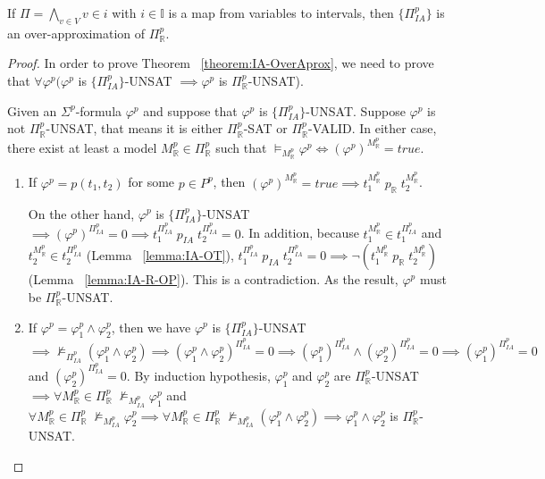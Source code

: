 \begin{theorem} \label{theorem:IA-OverAprox}
If $\Pi = \bigwedge\limits_{v \in V}v \in i$ with $i \in \mathbb{I}$ is a map from variables to intervals, then $\{\Pi^p_{IA}\}$ is an over-approximation of $\Pi^p_\mathbb{R}$.
\end{theorem}

\begin{proof}
In order to prove Theorem ~\ref{theorem:IA-OverAprox}, we need to prove that $\forall \varphi^p (\varphi^p$ is $\{\Pi^p_{IA}\}$-UNSAT $\implies \varphi^p$ is $\Pi^p_\mathbb{R}$-UNSAT). 

Given an $\Sigma^p$-formula $\varphi^p$ and suppose that $\varphi^p$ is $\{\Pi^p_{IA}\}$-UNSAT.
Suppose $\varphi^p$ is not $\Pi^p_\mathbb{R}$-UNSAT, that means it is either  $\Pi^p_\mathbb{R}$-SAT or  $\Pi^p_\mathbb{R}$-VALID. In either case, there exist at least a model $M^p_\mathbb{R} \in \Pi^p_\mathbb{R}$ such that $\models_{M^p_\mathbb{R}} \varphi^p \iff (\varphi^p)^{M^p_\mathbb{R}}= true$.
\begin{enumerate}
\item \sloppy If $\varphi^p = p(t_1, t_2)$ for some $p \in P^p$, then $(\varphi^p)^{M^p_\mathbb{R}}= true \implies t_1^{M^p_\mathbb{R}} \; p_\mathbb{R} \; t_2^{M^p_\mathbb{R}}$. 

On the other hand, $\varphi^p$ is $\{\Pi^p_{IA}\}$-UNSAT $\implies (\varphi^p)^{\Pi^p_{IA}} = 0  \implies t_1^{\Pi^p_{IA}} \; p_{IA} \; t_2^{\Pi^p_{IA}} = 0 $. In addition, because $t_1^{M^p_\mathbb{R}} \in t_1^{\Pi^p_{IA}}$ and $t_2^{M^p_\mathbb{R}} \in t_2^{\Pi^p_{IA}}$ (Lemma ~\ref{lemma:IA-OT}), ${t_1^{\Pi^p_{IA}} \; p_{IA} \; t_2^{\Pi^p_{IA}} = 0}  \implies \neg(t_1^{M^p_\mathbb{R}} \; p_\mathbb{R} \; t_2^{M^p_\mathbb{R}})$ (Lemma ~\ref{lemma:IA-R-OP}). This is a contradiction. As the result, $\varphi^p$ must be $\Pi^p_\mathbb{R}$-UNSAT.
\item If $\varphi^p = \varphi^p_1 \wedge \varphi^p_2$, then we have $\varphi^p$ is  $\{\Pi^p_{IA}\}$-UNSAT $\implies \not\models_{\Pi^p_{IA}}(\varphi^p_1 \wedge \varphi^p_2) \implies (\varphi^p_1 \wedge \varphi^p_2)^{\Pi^p_{IA}} = 0  \implies (\varphi^p_1)^{\Pi^p_{IA}} \wedge (\varphi^p_2)^{\Pi^p_{IA}} = 0  \implies (\varphi^p_1)^{\Pi^p_{IA}} = 0 $ and $(\varphi^p_2)^{\Pi^p_{IA}} = 0 $. By induction hypothesis, $\varphi^p_1$ and $\varphi^p_2$ are $\Pi^p_\mathbb{R}$-UNSAT $\implies \forall M^p_\mathbb{R} \in \Pi^p_\mathbb{R} \; \not\models_{M^p_{IA}} \varphi^p_1$ and $\forall M^p_\mathbb{R} \in \Pi^p_\mathbb{R} \; \not\models_{M^p_{IA}} \varphi^p_2 \implies \forall M^p_\mathbb{R} \in \Pi^p_\mathbb{R} \; \not\models_{M^p_{IA}} (\varphi^p_1 \wedge \varphi^p_2) \implies \varphi^p_1 \wedge \varphi^p_2$ is $\Pi^p_\mathbb{R}$-UNSAT.
\end{enumerate}
\end{proof}

